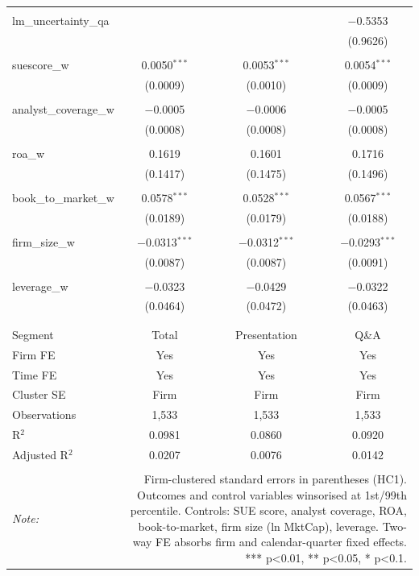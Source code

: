 \begin{table}[!htbp]
\begin{tabular}{@{\extracolsep{5pt}}lccc}
  & & & \\ 
 lm\_uncertainty\_qa &  &  & $-$0.5353 \\ 
  &  &  & (0.9626) \\ 
  & & & \\ 
 suescore\_w & 0.0050$^{***}$ & 0.0053$^{***}$ & 0.0054$^{***}$ \\ 
  & (0.0009) & (0.0010) & (0.0009) \\ 
  & & & \\ 
 analyst\_coverage\_w & $-$0.0005 & $-$0.0006 & $-$0.0005 \\ 
  & (0.0008) & (0.0008) & (0.0008) \\ 
  & & & \\ 
 roa\_w & 0.1619 & 0.1601 & 0.1716 \\ 
  & (0.1417) & (0.1475) & (0.1496) \\ 
  & & & \\ 
 book\_to\_market\_w & 0.0578$^{***}$ & 0.0528$^{***}$ & 0.0567$^{***}$ \\ 
  & (0.0189) & (0.0179) & (0.0188) \\ 
  & & & \\ 
 firm\_size\_w & $-$0.0313$^{***}$ & $-$0.0312$^{***}$ & $-$0.0293$^{***}$ \\ 
  & (0.0087) & (0.0087) & (0.0091) \\ 
  & & & \\ 
 leverage\_w & $-$0.0323 & $-$0.0429 & $-$0.0322 \\ 
  & (0.0464) & (0.0472) & (0.0463) \\ 
  & & & \\ 
\hline \\[-1.8ex] 
Segment & Total & Presentation & Q\&A \\ 
Firm FE & Yes & Yes & Yes \\ 
Time FE & Yes & Yes & Yes \\ 
Cluster SE & Firm & Firm & Firm \\ 
Observations & 1,533 & 1,533 & 1,533 \\ 
R$^{2}$ & 0.0981 & 0.0860 & 0.0920 \\ 
Adjusted R$^{2}$ & 0.0207 & 0.0076 & 0.0142 \\ 
\hline 
\hline \\[-1.8ex] 
\textit{Note:}  & \multicolumn{3}{r}{Firm-clustered standard errors in parentheses (HC1). Outcomes and control variables winsorised at 1st/99th percentile. Controls: SUE score, analyst coverage, ROA, book-to-market, firm size (ln MktCap), leverage. Two-way FE absorbs firm and calendar-quarter fixed effects. *** p<0.01, ** p<0.05, * p<0.1.} \\ 
\end{tabular} 
\end{table} 
